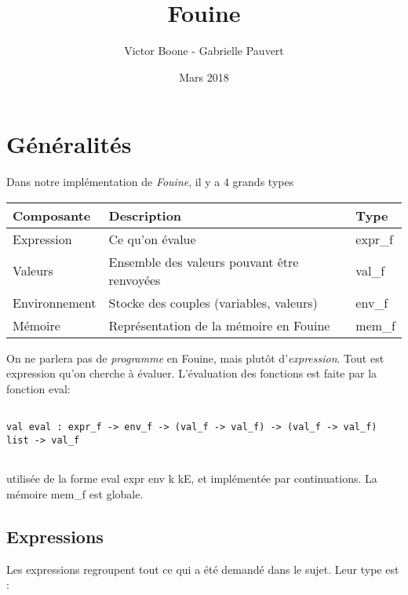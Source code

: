 \documentclass{article}
\title{\textbf{Fouine}}
\date{Mars 2018}
\author{Victor Boone - Gabrielle Pauvert}
\newcommand\code[1]{{\fontfamily{lmtt}\selectfont #1}}
\begin{document}
\maketitle


\section{Généralités}

	Dans notre implémentation de \emph{Fouine}, il y a $4$ grands types
	
	\vspace{0.5cm}
	
	\begin{tabular}{l l l}
	Composante & Description & Type \\
	\hline
	Expression & Ce qu'on évalue & \code{expr\_f} \\
	Valeurs & Ensemble des valeurs pouvant être renvoyées & \code{val\_f} \\
	Environnement & Stocke des couples (variables, valeurs) & \code{env\_f} \\
	Mémoire & Représentation de la mémoire en Fouine & \code{mem\_f} 
	\end{tabular}
	
	\vspace{0.5cm}
	
	On ne parlera pas de \emph{programme} en Fouine, mais plutôt d'\emph{expression}. Tout est expression qu'on cherche à évaluer. L'évaluation des fonctions est faite par la fonction \code{eval}:
	
	
	\begin{verbatim}
	
val eval : expr_f -> env_f -> (val_f -> val_f) -> (val_f -> val_f) list -> val_f
	
	\end{verbatim}
	
	utilisée de la forme \code{eval expr env k kE}, et implémentée par continuations.
	La mémoire \code{mem\_f} est globale.

\subsection{Expressions}

	Les expressions regroupent tout ce qui a été demandé dans le sujet. Leur type est :
	
\end{document}
